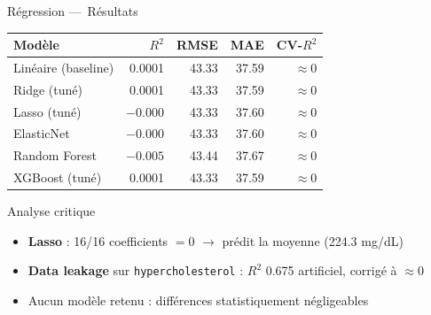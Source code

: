 \documentclass[12pt]{beamer}
\begin{document}
\begin{frame}{Régression ---~Résultats}

\begin{center}
\small
\begin{tabular}{lrrrr}
\toprule
Modèle & $R^2$ & RMSE & MAE & CV-$R^2$ \\
\midrule
Linéaire (baseline) & 0.0001 & 43.33 & 37.59 & $\approx 0$ \\
Ridge (tuné)        & 0.0001 & 43.33 & 37.59 & $\approx 0$ \\
Lasso (tuné)        & $-0.000$ & 43.33 & 37.60 & $\approx 0$ \\
ElasticNet          & $-0.000$ & 43.33 & 37.60 & $\approx 0$ \\
Random Forest       & $-0.005$ & 43.44 & 37.67 & $\approx 0$ \\
XGBoost (tuné)      & 0.0001 & 43.33 & 37.59 & $\approx 0$ \\
\bottomrule
\end{tabular}
\end{center}

\smallskip

\begin{block}{Analyse critique}
\small
\begin{itemize}
  \item \textbf{Lasso} : 16/16 coefficients $= 0$ $\rightarrow$ prédit la moyenne (224.3 mg/dL)
  \item \textbf{Data leakage} sur \texttt{hypercholesterol} : $R^2$ 0.675 artificiel, corrigé à $\approx 0$
  \item Aucun modèle retenu : différences statistiquement négligeables
\end{itemize}
\end{block}

\end{frame}
\end{document}
